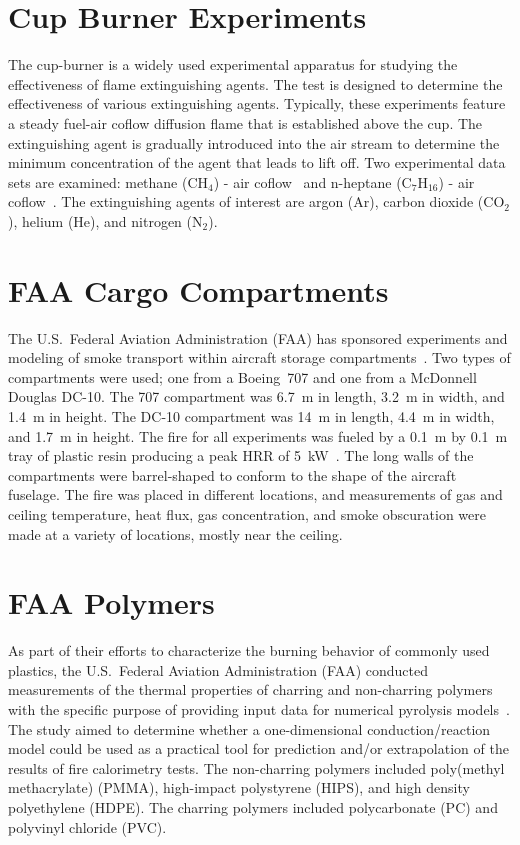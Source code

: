 \section{Cup Burner Experiments}

The cup-burner is a widely used experimental apparatus for studying the effectiveness of flame extinguishing agents. The test is designed to determine the effectiveness of various extinguishing agents. Typically, these experiments feature a steady fuel-air coflow diffusion flame that is established above the cup. The extinguishing agent is gradually introduced into the air stream to determine the minimum concentration of the agent that leads to lift off. Two experimental data sets are examined: methane (CH$_4$) - air coflow~\cite{Takahashi:2007} and n-heptane (C$_7$H$_{16}$) - air coflow~\cite{Moore:1996}. The extinguishing agents of interest are argon (Ar), carbon dioxide (CO$_2$), helium (He), and nitrogen (N$_2$).

\section{FAA Cargo Compartments}

The U.S.~Federal Aviation Administration (FAA) has sponsored experiments and modeling of smoke transport within aircraft storage compartments~\cite{FAA-AR-03-49,FAA-AR-07-27}. Two types of compartments were used; one from a Boeing~707 and one from a McDonnell Douglas DC-10. The 707 compartment was 6.7~m in length, 3.2~m in width, and 1.4~m in height. The DC-10 compartment was 14~m in length, 4.4~m in width, and 1.7~m in height. The fire for all experiments was fueled by a 0.1~m by 0.1~m tray of plastic resin producing a peak HRR of 5~kW~\cite{FAA-AR-06-21}. The long walls of the compartments were barrel-shaped to conform to the shape of the aircraft fuselage. The fire was placed in different locations, and measurements of gas and ceiling temperature, heat flux, gas concentration, and smoke obscuration were made at a variety of locations, mostly near the ceiling.


\section{FAA Polymers}

As part of their efforts to characterize the burning behavior of commonly used plastics, the U.S.~Federal Aviation Administration (FAA) conducted measurements of the thermal properties of
charring and non-charring polymers with the specific purpose of providing input data for numerical pyrolysis models~\cite{Stoliarov:CF2009,Stoliarov:CF2010}.
The study aimed to determine whether a one-dimensional conduction/reaction model could be used
as a practical tool for prediction and/or extrapolation of the results of fire calorimetry tests. The non-charring polymers included poly(methyl methacrylate) (PMMA),
high-impact polystyrene (HIPS), and high density
polyethylene (HDPE). The charring polymers included polycarbonate (PC) and polyvinyl chloride (PVC).



